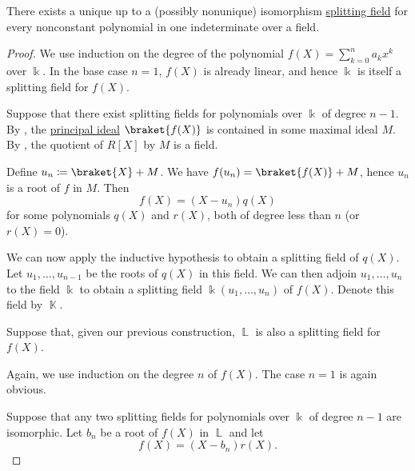 \begin{proposition}\label{thm:splitting_field_existence}
  There exists a unique up to a (possibly nonunique) isomorphism \hyperref[def:splitting_field]{splitting field} for every nonconstant polynomial in one indeterminate over a field.
\end{proposition}
\begin{proof}
   We use induction on the degree of the polynomial \( f(X) = \sum_{k=0}^n a_k x^k \) over \( \Bbbk \). In the base case \( n = 1 \), \( f(X) \) is already linear, and hence \( \Bbbk \) is itself a splitting field for \( f(X) \).

  Suppose that there exist splitting fields for polynomials over \( \Bbbk \) of degree \( n - 1 \). By , the \hyperref[def:semiring_ideal]{principal ideal} \( \braket{ f(X) } \) is contained in some maximal ideal \( M \). By , the quotient of \( R[X] \) by \( M \) is a field.

  Define \( u_n \coloneqq \braket{ X } + M \). We have \( f(u_n) = \braket{ f(X) } + M \), hence \( u_n \) is a root of \( f \) in \( M \). Then
  \begin{equation*}
    f(X) = (X - u_n) q(X)
  \end{equation*}
  for some polynomials \( q(X) \) and \( r(X) \), both of degree less than \( n \) (or \( r(X) = 0 \)).

  We can now apply the inductive hypothesis to obtain a splitting field of \( q(X) \). Let \( u_1, \ldots, u_{n-1} \) be the roots of \( q(X) \) in this field. We can then adjoin \( u_1, \ldots, u_n \) to the field \( \Bbbk \) to obtain a splitting field \( \Bbbk(u_1, \ldots, u_n) \) of \( f(X) \). Denote this field by \( \BbbK \).

   Suppose that, given our previous construction, \( \BbbL \) is also a splitting field for \( f(X) \).

  Again, we use induction on the degree \( n \) of \( f(X) \). The case \( n = 1 \) is again obvious.

  Suppose that any two splitting fields for polynomials over \( \Bbbk \) of degree \( n - 1 \) are isomorphic. Let \( b_n \) be a root of \( f(X) \) in \( \BbbL \) and let
  \begin{equation*}
    f(X) = (X - b_n) r(X).
  \end{equation*}


\end{proof}
